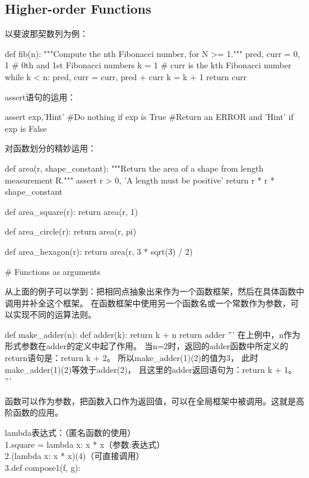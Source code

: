 \documentclass{ctexart}
\begin{document}
\subsection{Higher-order Functions}
以斐波那契数列为例：
\begin{python}
    def fib(n): 
 """Compute the nth Fibonacci number, for N >= 1."""
 pred, curr = 0, 1 # 0th and 1st Fibonacci numbers
 k = 1 # curr is the kth Fibonacci number
 while k < n: 
 pred, curr = curr, pred + curr 
 k = k + 1
 return curr
\end{python}

assert语句的运用：

\begin{python}
    assert exp,'Hint'
    #Do nothing if exp is True
    #Return an ERROR and 'Hint' if exp is False
\end{python}

对函数划分的精妙运用：

\begin{python}
    def area(r, shape_constant):
    """Return the area of a shape from length measurement R."""
    assert r > 0, 'A length must be positive'
    return r * r * shape_constant

def area_square(r):
    return area(r, 1)

def area_circle(r):
    return area(r, pi)

def area_hexagon(r):
    return area(r, 3 * sqrt(3) / 2)

# Functions as arguments
\end{python}
从上面的例子可以学到：把相同点抽象出来作为一个函数框架，然后在具体函数中调用并补全这个框架。
在函数框架中使用另一个函数名或一个常数作为参数，可以实现不同的运算法则。
\begin{python}
    def make_adder(n):
        def adder(k):
            return k + n
        return adder 
'''
在上例中，n作为形式参数在adder的定义中起了作用。
当n=2时，返回的adder函数中所定义的return语句是：return k + 2。
所以make_adder(1)(2)的值为3，
此时make_adder(1)(2)等效于adder(2)，
且这里的adder返回语句为：return k + 1。
'''
\end{python}
函数可以作为参数，把函数入口作为返回值，可以在全局框架中被调用。这就是高阶函数的应用。

lambda表达式：（匿名函数的使用）
\\1.square = lambda x: x * x（参数:表达式）
\\2.(lambda x: x * x)(4)（可直接调用）
\\3.def compose1(f, g):
\end{document}
